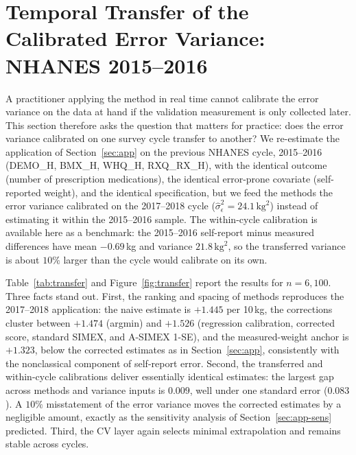 \section{Temporal Transfer of the Calibrated Error Variance: NHANES
2015--2016}\label{sec:transfer}

A practitioner applying the method in real time cannot calibrate the
error variance on the data at hand if the validation measurement is
only collected later. This section therefore asks the question that
matters for practice: does the error variance calibrated on one survey
cycle transfer to another? We re-estimate the application of
Section~\ref{sec:app} on the previous NHANES cycle, 2015--2016
(DEMO\_H, BMX\_H, WHQ\_H, RXQ\_RX\_H), with the identical outcome
(number of prescription medications), the identical error-prone
covariate (self-reported weight), and the identical specification, but
we feed the methods the error variance calibrated on the 2017--2018
cycle ($\hat\sigma^2_\epsilon = 24.1\,\mathrm{kg}^2$) instead of
estimating it within the 2015--2016 sample. The within-cycle
calibration is available here as a benchmark: the 2015--2016
self-report minus measured differences have mean $-0.69$\,kg and
variance $21.8\,\mathrm{kg}^2$, so the transferred variance is about
$10\%$ larger than the cycle would calibrate on its own.

Table~\ref{tab:transfer} and Figure~\ref{fig:transfer} report the
results for $n = 6{,}100$. Three facts stand out. First, the ranking
and spacing of methods reproduces the 2017--2018 application: the
naive estimate is $+1.445$ per 10\,kg, the corrections cluster between
$+1.474$ (argmin) and $+1.526$ (regression calibration, corrected score,
standard SIMEX, and A-SIMEX 1-SE), and the measured-weight anchor is $+1.323$, below the
corrected estimates as in Section~\ref{sec:app}, consistently with the
nonclassical component of self-report error. Second, the transferred
and within-cycle calibrations deliver essentially identical estimates:
the largest gap across methods and variance inputs is
$0.009$, well under one standard error ($0.083$). A $10\%$
misstatement of the error variance moves the corrected estimates by a
negligible amount, exactly as the sensitivity analysis of
Section~\ref{sec:app-sens} predicted. Third, the CV layer again
selects minimal extrapolation and remains stable across cycles.

